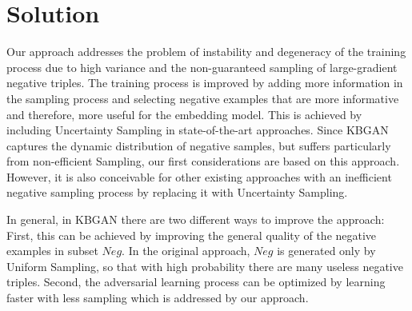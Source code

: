 \chapter{Solution}
\label{ch:solution}

Our approach addresses the problem of instability and degeneracy of the training process due to high variance and the non-guaranteed sampling of large-gradient negative triples.
The training process is improved by adding more information in the sampling process and selecting negative examples that are more informative and therefore, more useful for the embedding model.
This is achieved by including Uncertainty Sampling in state-of-the-art approaches.
Since \ac{KBGAN} captures the dynamic distribution of negative samples, but suffers particularly from non-efficient Sampling, our first considerations are based on this approach.
However, it is also conceivable for other existing approaches with an inefficient negative sampling process by replacing it with Uncertainty Sampling.

In general, in \ac{KBGAN} there are two different ways to improve the approach:
First, this can be achieved by improving the general quality of the negative examples in subset $Neg$.
In the original approach, $Neg$ is generated only by Uniform Sampling, so that with high probability there are many useless negative triples.
Second, the adversarial learning process can be optimized by learning faster with less sampling which is addressed by our approach.

